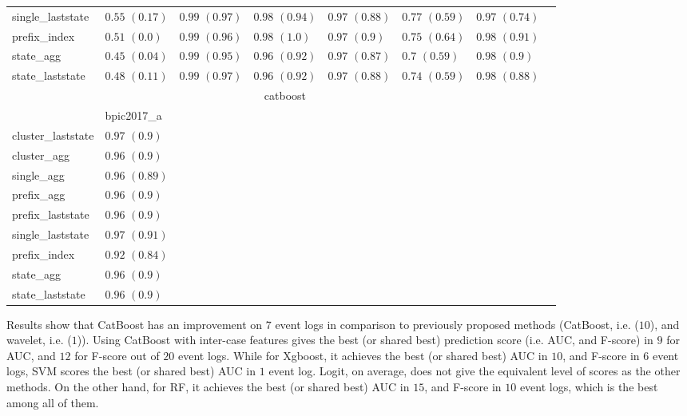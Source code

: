 \begin{table}[!htbp]
{\begin{tabular}{llllllll}
			single\_laststate & $0.55$ ${(0.17)}$ & $\mathbf{0.99}$ $\mathbf{(0.97)}$  & $\mathbf{0.98}$ $\mathbf{(0.94)}$  & $0.97$ ${(0.88)}$ & $0.77$ ${(0.59)}$ & $0.97$ ${(0.74)}$ \\
			prefix\_index & $0.51$ ${(0.0)}$ & $\mathbf{0.99}$ $\mathbf{(0.96)}$  & $\mathbf{0.98}$ $\mathbf{(1.0)}$  & $0.97$ ${(0.9)}$ & $0.75$ ${(0.64)}$ & $\mathbf{0.98}$ $\mathbf{(0.91)}$  \\
			state\_agg & $0.45$ ${(0.04)}$ & $\mathbf{0.99}$ $\mathbf{(0.95)}$  & $0.96$ ${(0.92)}$ & $0.97$ ${(0.87)}$ & $0.7$ ${(0.59)}$ & $0.98$ ${(0.9)}$ \\
			state\_laststate & $0.48$ ${(0.11)}$ & $\mathbf{0.99}$ $\mathbf{(0.97)}$  & $0.96$ ${(0.92)}$ & $0.97$ ${(0.88)}$ & $0.74$ ${(0.59)}$ & $0.98$ ${(0.88)}$ \\
			\bottomrule
			\toprule
			& \multicolumn{5}{c}{catboost}
			\\
			& bpic2017\_a
			\\ \midrule
			cluster\_laststate & $\mathbf{0.97}$ $\mathbf{(0.9)}$  \\
			cluster\_agg & $0.96$ ${(0.9)}$ \\
			single\_agg & $0.96$ ${(0.89)}$ \\
			prefix\_agg & $0.96$ ${(0.9)}$ \\
			prefix\_laststate & $0.96$ ${(0.9)}$ \\
			single\_laststate & $\mathbf{0.97}$ $\mathbf{(0.91)}$  \\
			prefix\_index & $0.92$ ${(0.84)}$ \\
			state\_agg & $0.96$ ${(0.9)}$ \\
			state\_laststate & $0.96$ ${(0.9)}$ \\
			\bottomrule
			
		\end{tabular}%
	}
\end{table}

Results show that CatBoost has an improvement on $7$ event logs in comparison to previously proposed methods (CatBoost, i.e. ($10$), and wavelet, i.e. ($1$)). 
Using CatBoost with inter-case features gives the best (or shared best) prediction score (i.e. AUC, and F-score) in $9$ for AUC, and $12$ for F-score out of $20$ event logs. While for Xgboost, it achieves the best (or shared best)  AUC in $10$, and F-score in $6$ event logs, SVM scores the best (or shared best) AUC in $1$ event log. Logit, on average, does not give the equivalent level of scores as the other methods. On the other hand, for RF, it achieves the best (or shared best) AUC in $15$, and F-score in $10$ event logs, which is the best among all of them.

